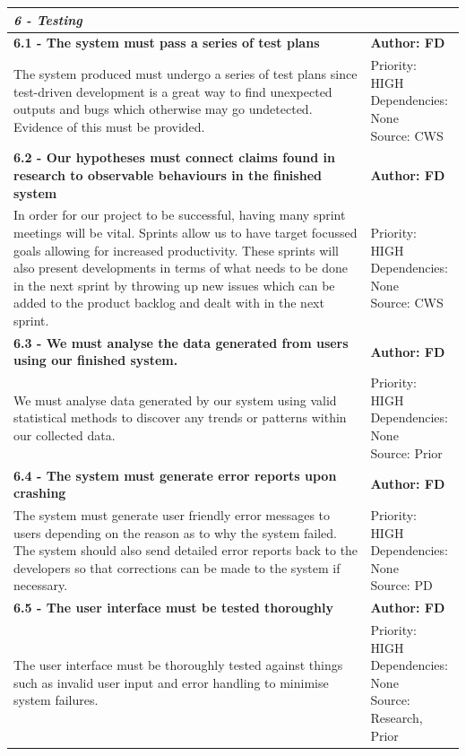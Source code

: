 \documentclass[10pt, notitlepage]{report}
\begin{document}
\begin{center}
\begin{longtable}{| p{13cm} | p{3cm} |}
\multicolumn{2}{|l|}{\textbf{\textit{6 - Testing}}} \\
\hline
\textbf{6.1 - The system must pass a series of test plans} & \textbf{Author: FD} \\
\hline
The system produced must undergo a series of test plans since test-driven development is a great way to find unexpected outputs and bugs which otherwise may go undetected. Evidence of this must be provided.&
\makecell{Priority: HIGH\\Dependencies: None\\Source: CWS}\\
\hline
\textbf{6.2 - Our hypotheses must connect claims found in research to observable behaviours in the finished system} & \textbf{Author: FD} \\
\hline
In order for our project to be successful, having many sprint meetings will be vital. Sprints allow us to have target focussed goals allowing for increased productivity. These sprints will also present developments in terms of what needs to be done in the next sprint by throwing up new issues which can be added to the product backlog and dealt with in the next sprint.&
\makecell{Priority: HIGH\\Dependencies: None\\Source: CWS}\\
\hline
\textbf{6.3 - We must analyse the data generated from users using our finished system.} & \textbf{Author: FD} \\
\hline
We must analyse data generated by our system using valid statistical methods to discover any trends or patterns within our collected data.&
\makecell{Priority: HIGH\\Dependencies: None\\Source: Prior}\\
\hline
\textbf{6.4 - The system must generate error reports upon crashing} & \textbf{Author: FD} \\
\hline
The system must generate user friendly error messages to users depending on the reason as to why the system failed. The system should also send detailed error reports back to the developers so that corrections can be made to the system if necessary.&
\makecell{Priority: HIGH\\Dependencies: None\\Source: PD}\\
\hline
\textbf{6.5 - The user interface must be tested thoroughly} & \textbf{Author: FD} \\
\hline
The user interface must be thoroughly tested against things such as invalid user input and error handling to minimise system failures.&
\makecell{Priority: HIGH\\Dependencies: None\\Source: Research,\\Prior}\\
\hline
\end{longtable}

\end{center}
\end{document}
